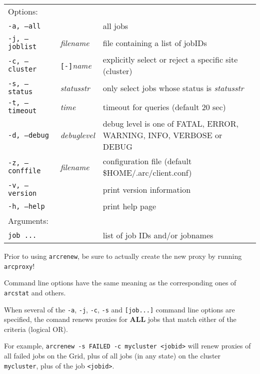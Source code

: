 \hspace*{0.5cm}
\begin{shaded}
\end{shaded}
\begin{longtable}{llp{8cm}}
   Options:&&\\
   \texttt{-a, --all}& & all jobs\\
   \texttt{-j, --joblist}& \textit{filename} & file containing a list of jobIDs\\
   \texttt{-c, --cluster}&\verb#[-]#\textit{name}&explicitly select or reject a specific site (cluster)\\
   \texttt{-s, --status}& \textit{statusstr} &only select jobs whose status is \textit{statusstr}\\
   \texttt{-t, --timeout}& \textit{time} & timeout for queries (default 20 sec)\\
   \texttt{-d, --debug}& \textit{debuglevel}&debug level is one of  FATAL, ERROR, WARNING, INFO, VERBOSE or DEBUG\\
   \texttt{-z, --conffile}&\textit{filename}& configuration file (default {\$}HOME/.arc/client.conf)\\
   \texttt{-v, --version}& & print version information\\
   \texttt{-h, --help}& & print help page\\
   Arguments:&&\\
   \texttt{job ...} && list of job IDs and/or jobnames\\
\end{longtable}

\begin{framed}
 Prior to using \texttt{arcrenew}, be sure to actually create the
new proxy by running \verb#arcproxy#!
\end{framed}

Command line options have the same meaning as the corresponding ones of \verb#arcstat# and others.

\begin{framed}
  When several of the \verb#-a#,  \verb#-j#, \verb#-c#, \verb#-s# and \verb#[job...]#
  command line options are specified, the comand renews proxies for \textbf{ALL} jobs that
  match either of the criteria (logical OR).

  For example, \verb#arcrenew -s FAILED -c mycluster <jobid># will renew proxies of all failed
  jobs on the Grid, plus of all jobs (in any state) on the cluster \verb#mycluster#, plus of the job \verb#<jobid>#.
\end{framed}


